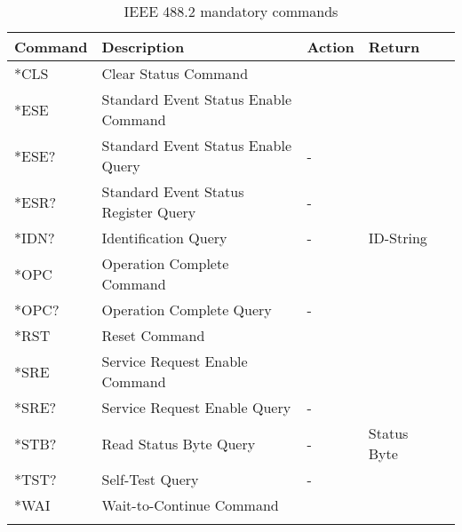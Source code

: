 		\begin{longtable}{|l|l|l|l|l|}				\hline
			Command & 	Description									& 	Action	& Return		\\ \hline
			*CLS	& Clear Status Command							& 		& 		\\ \hline
			*ESE & Standard Event Status Enable Command	& 		& 		\\ \hline
			*ESE? & Standard Event Status Enable Query 		& -		& 		\\ \hline
			*ESR? & Standard Event Status Register Query 	& -		& 		\\ \hline
			*IDN? & Identification Query 							& 	-	& ID-String \\ \hline
			*OPC & Operation Complete Command 				& 		& 		\\ \hline
			*OPC? & Operation Complete Query 					& 	-	& 		\\ \hline
			*RST & Reset Command 									& 		& 		\\ \hline
			*SRE & Service Request Enable Command 			& 		& 		\\ \hline
			*SRE? & Service Request Enable Query 				& 	-	& 		\\ \hline
			*STB? & Read Status Byte Query 						& 	-	& Status Byte		\\ \hline
			*TST? & Self-Test Query 									& 	-	& 		\\ \hline
			*WAI & Wait-to-Continue Command 					& 		& 		\\ \hline
			\caption{IEEE 488.2 mandatory commands}
		\end{longtable}
		
